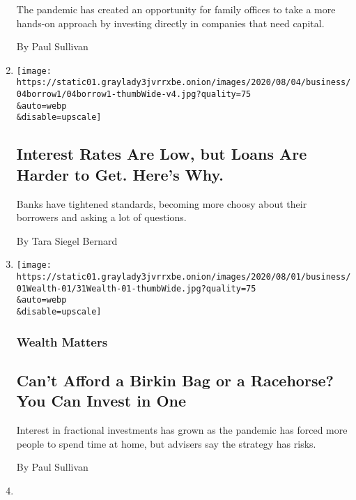 \begin{enumerate}
  The pandemic has created an opportunity for family offices to take a
  more hands-on approach by investing directly in companies that need
  capital.

  By Paul Sullivan
\item
  \href{/2020/08/04/your-money/mortgage-loans-credit-cards-coronavirus.html}{}

  \texttt{[image: https://static01.graylady3jvrrxbe.onion/images/2020/08/04/business/04borrow1/04borrow1-thumbWide-v4.jpg?quality=75\\\&auto=webp\\\&disable=upscale]}

  \hypertarget{interest-rates-are-low-but-loans-are-harder-to-get-heres-why}{%
  \subsection{Interest Rates Are Low, but Loans Are Harder to Get.
  Here's
  Why.}\label{interest-rates-are-low-but-loans-are-harder-to-get-heres-why}}

  Banks have tightened standards, becoming more choosy about their
  borrowers and asking a lot of questions.

  By Tara Siegel Bernard
\item
  \href{/2020/07/31/your-money/birkin-bag-racehorse-invest.html}{}

  \texttt{[image: https://static01.graylady3jvrrxbe.onion/images/2020/08/01/business/01Wealth-01/31Wealth-01-thumbWide.jpg?quality=75\\\&auto=webp\\\&disable=upscale]}

  \hypertarget{wealth-matters-2}{%
  \subsubsection{Wealth Matters}\label{wealth-matters-2}}

  \hypertarget{cant-afford-a-birkin-bag-or-a-racehorse-you-can-invest-in-one}{%
  \subsection{Can't Afford a Birkin Bag or a Racehorse? You Can Invest
  in
  One}\label{cant-afford-a-birkin-bag-or-a-racehorse-you-can-invest-in-one}}

  Interest in fractional investments has grown as the pandemic has
  forced more people to spend time at home, but advisers say the
  strategy has risks.

  By Paul Sullivan
\item
  \href{/2020/07/30/travel/private-jets-coronavirus.html}{}


\end{enumerate}
